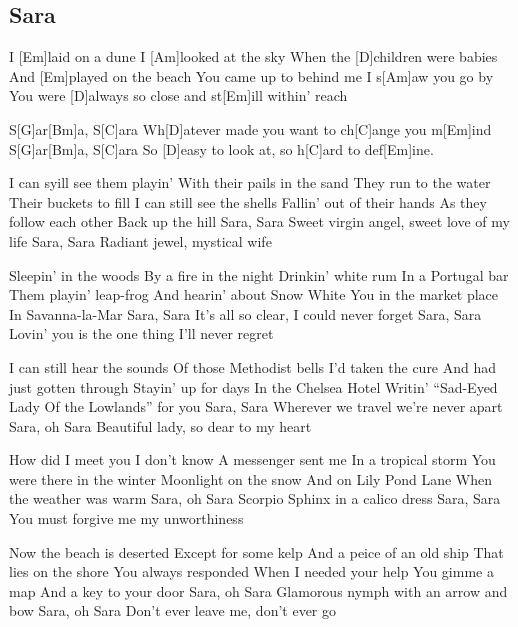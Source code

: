 \subsection*{Sara   }
\begin{guitar}
  \begin{multicols}{2}
I [Em]laid on a dune  
I [Am]looked at the sky  
When the [D]children were babies  
And [Em]played on the beach
You came up to behind me  
I s[Am]aw you go by   
You were [D]always so close  
and st[Em]ill within' reach


S[G]ar[Bm]a,  S[C]ara
Wh[D]atever made you want to ch[C]ange you m[Em]ind
S[G]ar[Bm]a,  S[C]ara
So [D]easy to look at, so h[C]ard to def[Em]ine.



I can syill see them playin'
With their pails in the sand
They run to the water
Their buckets to fill
I can still see the shells
Fallin' out of their hands
As they follow each other
Back up the hill
Sara, Sara
Sweet virgin angel, sweet love of my life
Sara, Sara
Radiant jewel, mystical wife



Sleepin' in the woods
By a fire in the night
Drinkin' white rum
In a Portugal bar
Them playin' leap-frog
And hearin' about Snow White
You in the market place
In Savanna-la-Mar
Sara, Sara
It's all so clear, I could never forget
Sara, Sara
Lovin' you is the one thing I'll never regret



I can still hear the sounds
Of those Methodist bells
I'd taken the cure
And had just gotten through
Stayin' up for days
In the Chelsea Hotel
Writin' ``Sad-Eyed Lady
Of the Lowlands'' for you
Sara, Sara
Wherever we travel we're never apart
Sara, oh Sara
Beautiful lady, so dear to my heart



\columnbreak
How did I meet you
I don't know
A messenger sent me
In a tropical storm
You were there in the winter
Moonlight on the snow
And on Lily Pond Lane
When the weather was warm
Sara, oh Sara
Scorpio Sphinx in a calico dress
Sara, Sara
You must forgive me my unworthiness



Now the beach is deserted
Except for some kelp
And a peice of an old ship
That lies on the shore
You always responded
When I needed your help
You gimme a map
And a key to your door
Sara, oh Sara
Glamorous nymph with an arrow and bow
Sara, oh Sara
Don't ever leave me, don't ever go
\end{multicols}
\end{guitar}
